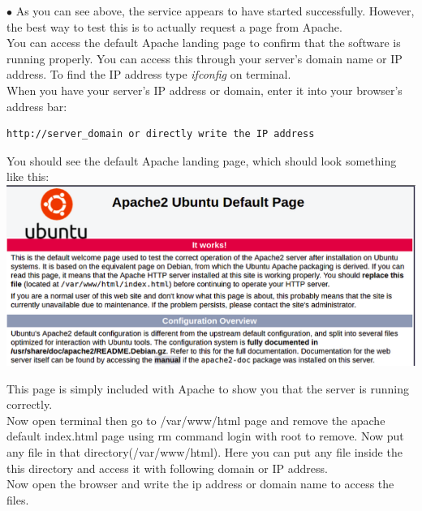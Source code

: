 \documentclass[journal,12pt,onecolumn]{IEEEtran}
\begin{document}
\begin{flushleft}
\begin{enumerate}
$\bullet$ As you can see above, the service appears to have started successfully. However, the best way to test this is to actually request a page from Apache.\\
\medskip
You can access the default Apache landing page to confirm that the software is running properly. You can access this through your server's domain name or IP address. To find the IP address type \textit{ifconfig} on terminal.\\
\medskip
When you have your server's IP address or domain, enter it into your browser's address bar:\\
\medskip
\begin{lstlisting}[frame=single,linewidth=15cm,breaklines=true]
http://server_domain or directly write the IP address
\end{lstlisting}
\bigskip
You should see the default Apache landing page, which should look something like this:\\
\medskip
\includegraphics[scale=.4]{img4.png}

This page is simply included with Apache to show you that the server is running correctly.\\
\bigskip
Now open terminal then go to /var/www/html page and remove the apache default index.html page using rm command login with root to remove.
Now put any file in that directory(/var/www/html). Here you can put any file inside the this directory and access it with following domain or IP address.\\
\medskip
Now open the browser and write the ip address or domain name to access the files.\\
\bigskip


\end{enumerate}
\end{flushleft}
\end{document}
